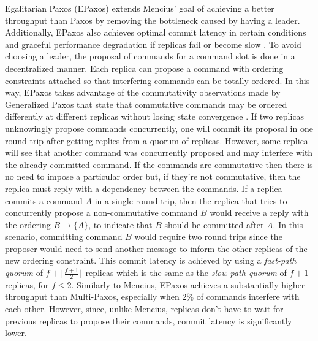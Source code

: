 Egalitarian Paxos (EPaxos) extends Mencius' goal of achieving a better throughput than Paxos by removing the bottleneck caused by having a leader. Additionally, EPaxos also achieves optimal commit latency in certain conditions and graceful performance degradation if replicas fail or become slow \cite{Moraru2013}. To avoid choosing a leader, the proposal of commands for a command slot is done in a decentralized manner. Each replica can propose a command with ordering constraints attached so that interfering commands can be totally ordered. In this way, EPaxos takes advantage of the commutativity observations made by Generalized Paxos that state that commutative commands may be ordered differently at different replicas without losing state convergence \cite{Lamport2005}. If two replicas unknowingly propose commands concurrently, one will commit its proposal in one round trip after getting replies from a quorum of replicas. However, some replica will see that another command was concurrently proposed and may interfere with the already committed command. If the commands are commutative then there is no need to impose a particular order but, if they're not commutative, then the replica must reply with a dependency between the commands. If a replica commits a command $A$ in a single round trip, then the replica that tries to concurrently propose a non-commutative command $B$ would receive a reply with the ordering $B \rightarrow \{A\}$, to indicate that $B$ should be committed after $A$. In this scenario, committing command $B$ would require two round trips since the proposer would need to send another message to inform the other replicas of the new ordering constraint. This commit latency is achieved by using a \textit{fast-path quorum} of $f+\lfloor\frac{f+1}{2}\rfloor$ replicas which is the same as the \textit{slow-path quorum} of $f+1$ replicas, for $f \leq 2$. Similarly to Mencius, EPaxos achieves a substantially higher throughput than Multi-Paxos, especially when $2\%$ of commands interfere with each other. However, since, unlike Mencius, replicas don't have to wait for previous replicas to propose their commands, commit latency is significantly lower.\par
